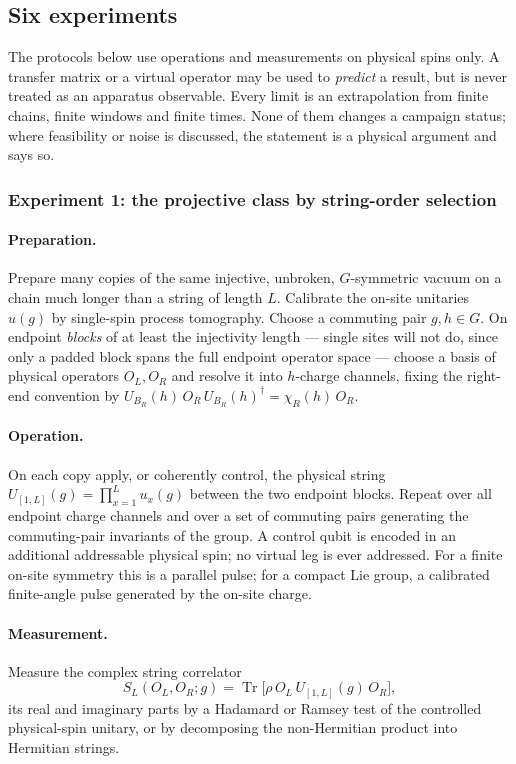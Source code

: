 \subsection{Six experiments}
\label{sec:op-experiments}

The protocols below use operations and measurements on physical spins only. A
transfer matrix or a virtual operator may be used to \emph{predict} a result,
but is never treated as an apparatus observable. Every limit is an
extrapolation from finite chains, finite windows and finite times. None of
them changes a campaign status; where feasibility or noise is discussed, the
statement is a physical argument and says so.

\subsubsection*{Experiment 1: the projective class by string-order selection}

\paragraph{Preparation.} Prepare many copies of the same injective, unbroken,
$G$-symmetric vacuum on a chain much longer than a string of length $L$.
Calibrate the on-site unitaries $u(g)$ by single-spin process tomography.
Choose a commuting pair $g,h\in G$. On endpoint \emph{blocks} of at least the
injectivity length --- single sites will not do, since only a padded block
spans the full endpoint operator space --- choose a basis of physical
operators $O_L,O_R$ and resolve it into $h$-charge channels, fixing the
right-end convention by
$U_{B_R}(h)\,O_R\,U_{B_R}(h)^{\dagger}=\chi_R(h)\,O_R$.

\paragraph{Operation.} On each copy apply, or coherently control, the physical
string $U_{[1,L]}(g)=\prod_{x=1}^{L}u_x(g)$ between the two endpoint blocks.
Repeat over all endpoint charge channels and over a set of commuting pairs
generating the commuting-pair invariants of the group. A control qubit is
encoded in an additional addressable physical spin; no virtual leg is ever
addressed. For a finite on-site symmetry this is a parallel pulse; for a
compact Lie group, a calibrated finite-angle pulse generated by the on-site
charge.

\paragraph{Measurement.} Measure the complex string correlator
\begin{equation}
  S_L(O_L,O_R;g)=\operatorname{Tr}\bigl[\rho\,O_L\,U_{[1,L]}(g)\,O_R\bigr],
  \label{eq:op-string-correlator}
\end{equation}
its real and imaginary parts by a Hadamard or Ramsey test of the controlled
physical-spin unitary, or by decomposing the non-Hermitian product into
Hermitian strings.

